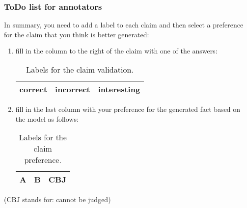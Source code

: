 \subsubsection*{ToDo list for annotators}
In summary, you need to add a label to each claim and then select a preference for the claim that you think is better generated:

\begin{enumerate}
    \item fill in the column to the right of the claim with one of the answers:
    \begin{table}[h]
        \centering
        \begin{tabular}{|c|c|c|}
            \hline
            correct & incorrect & interesting \\
            \hline
        \end{tabular}
    \caption{Labels for the claim validation.}
    \end{table}
    \item fill in the last column with your preference for the generated fact based on the model as follows:
    \begin{table}[h]
        \centering
        \begin{tabular}{|c|c|c|}
            \hline
            A & B & CBJ \\
            \hline
        \end{tabular}
    \caption{Labels for the claim preference.}
    \end{table}
\end{enumerate}
\noindent * (CBJ stands for: cannot be judged)